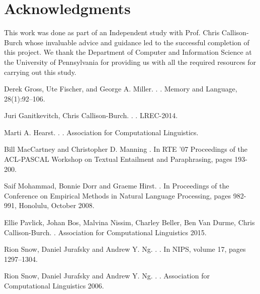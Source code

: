 \documentclass[11pt]{article}
\begin{document}
\section*{Acknowledgments}
This work was done as part of an Independent study with Prof. Chris Callison-Burch whose invaluable advice and guidance led to the successful completion of this project. We thank the Department of Computer and Information Science at the University of Pennsylvania for providing us with all the required resources for carrying out this study.

%
%

\begin{thebibliography}{}

Derek Gross, Ute Fischer, and George A. Miller. .
.
\newblock Memory and Language, 28(1):92–106.

Juri Ganitkevitch, Chris Callison-Burch.
.
.
\newblock LREC-2014.

Marti A. Hearst.
.
.
\newblock Association for Computational Linguistics.

Bill MacCartney and Christopher D. Manning
.
\newblock In RTE '07 Proceedings of the ACL-PASCAL Workshop on Textual Entailment and Paraphrasing, pages 193-200.

Saif Mohammad, Bonnie Dorr and Graeme Hirst.
.
\newblock In Proceedings of the Conference on Empirical Methods in Natural Language Processing, pages 982-991, Honolulu, October 2008.

Ellie Pavlick, Johan Bos, Malvina Nissim, Charley Beller, Ben Van Durme, Chris Callison-Burch.
.
\newblock Association for Computational Linguistics 2015.

Rion Snow, Daniel Jurafsky and Andrew Y. Ng.
.
.
\newblock In NIPS, volume 17, pages 1297–1304.

Rion Snow, Daniel Jurafsky and Andrew Y. Ng.
.
.
\newblock Association for Computational Linguistics 2006.


\end{thebibliography}
\end{document}
